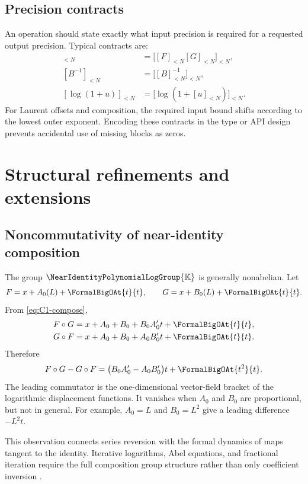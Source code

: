 \documentclass[11pt]{article}
\theoremstyle{pltheorem}
\newcommand{\K}{\mathbb K}
\newcommand{\Gnear}{\NearIdentityPolynomialLogGroup{\K}}
\newcommand{\compose}{\mathbin{\circ}}
\begin{document}
\subsection{Precision contracts}

An operation should state exactly what input precision is required for a requested output precision.  Typical contracts are:
\begin{align*}
 [FG]_{<N}&=\bigl[[F]_{<N}[G]_{<N}\bigr]_{<N},\\
 [B^{-1}]_{<N}&=\bigl[[B]_{<N}^{-1}\bigr]_{<N},\\
 [\log(1+u)]_{<N}&=\bigl[\log(1+[u]_{<N})\bigr]_{<N}.
\end{align*}
For Laurent offsets and composition, the required input bound shifts according to the lowest outer exponent.  Encoding these contracts in the type or API design prevents accidental use of missing blocks as zeros.

\section{Structural refinements and extensions}
\label{sec:extensions}

\subsection{Noncommutativity of near-identity composition}

The group \(\Gnear\) is generally nonabelian.  Let
\[
 F=x+A_0(L)+\FormalBigOAt{t}{t},
 \qquad
 G=x+B_0(L)+\FormalBigOAt{t}{t}.
\]
From \cref{eq:C1-compose},
\begin{align}
 F\compose G
 &=x+A_0+B_0+B_0A_0't+\FormalBigOAt{t}{t},\notag\\
 G\compose F
 &=x+A_0+B_0+A_0B_0't+\FormalBigOAt{t}{t}.
\end{align}
Therefore
\begin{equation}\label{eq:composition-commutator-leading}
 F\compose G-G\compose F
 =\bigl(B_0A_0'-A_0B_0'\bigr)t+\FormalBigOAt{t^2}{t}.
\end{equation}
The leading commutator is the one-dimensional vector-field bracket of the logarithmic displacement functions.  It vanishes when \(A_0\) and \(B_0\) are proportional, but not in general.  For example, \(A_0=L\) and \(B_0=L^2\) give a leading difference \(-L^2t\).

This observation connects series reversion with the formal dynamics of maps tangent to the identity.  Iterative logarithms, Abel equations, and fractional iteration require the full composition group structure rather than only coefficient inversion \cite{edgar-fractional}.
\end{document}
